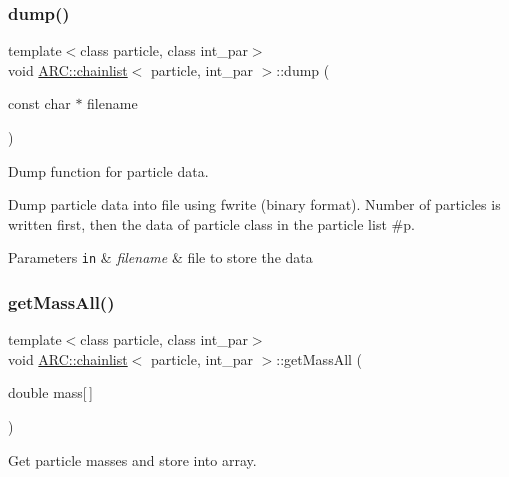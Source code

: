 \subsubsection{\texorpdfstring{dump()}{dump()}}
{\footnotesize\ttfamily template$<$class particle, class int\+\_\+par$>$ \\
void \hyperlink{classARC_1_1chainlist}{A\+R\+C\+::chainlist}$<$ particle, int\+\_\+par $>$\+::dump (\begin{DoxyParamCaption}\item[{const char $\ast$}]{filename }\end{DoxyParamCaption})\hspace{0.3cm}{\ttfamily [inline]}}



Dump function for particle data. 

Dump particle data into file using fwrite (binary format). Number of particles is written first, then the data of particle class in the particle list \#p. 
\begin{DoxyParams}[1]{Parameters}
\mbox{\tt in}  & {\em filename} & file to store the data \\
\hline
\end{DoxyParams}
\hypertarget{classARC_1_1chainlist_a5da7d970dfac2bb11f59d07c1d808f8e}{}\label{classARC_1_1chainlist_a5da7d970dfac2bb11f59d07c1d808f8e} 
\subsubsection{\texorpdfstring{get\+Mass\+All()}{getMassAll()}}
{\footnotesize\ttfamily template$<$class particle, class int\+\_\+par$>$ \\
void \hyperlink{classARC_1_1chainlist}{A\+R\+C\+::chainlist}$<$ particle, int\+\_\+par $>$\+::get\+Mass\+All (\begin{DoxyParamCaption}\item[{double}]{mass\mbox{[}$\,$\mbox{]} }\end{DoxyParamCaption})\hspace{0.3cm}{\ttfamily [inline]}}



Get particle masses and store into array. 

